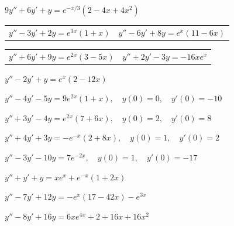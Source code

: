 \begin{exerciselist}
  \item\label{exer:5.4.14} $9y''+6y'+y=e^{-x/3}(2-4x+4x^{2})$


  \begin{tabular}[t]{@{}p{168pt}@{}p{168pt}}
    \item\label{exer:5.4.15} $y''-3y'+2y=e^{3x}(1+x)$ & \vspace*{10pt}
    \item\label{exer:5.4.16} $y''-6y'+8y=e^{x}(11-6x)$
  \end{tabular}

  \begin{tabular}[t]{@{}p{168pt}@{}p{168pt}}
    \item\label{exer:5.4.17} $y''+6y'+9y=e^{2x}(3-5x)$ &
    \item\label{exer:5.4.18} $y''+2y'-3y=-16xe^{x}$
  \end{tabular}

  \item\label{exer:5.4.19} $y''-2y'+y=e^{x}(2-12x)$

  \newpage

  \item\label{exer:5.4.20} \CGex $y''-4y'-5y=9e^{2x}(1+x),\quad y(0)=0,\quad y'(0)=-10$

  \item\label{exer:5.4.21} \CGex $y''+3y'-4y=e^{2x}(7+6x),\quad y(0)=2,\quad y'(0)=8$

  \item\label{exer:5.4.22} \CGex $y''+4y'+3y=-e^{-x}(2+8x),\quad y(0)=1,\quad y'(0)=2$

  \item\label{exer:5.4.23} \CGex $y''-3y'-10y=7e^{-2x},\quad y(0)=1,\quad y'(0)=-17$


  \item\label{exer:5.4.24} $y''+y'+y=xe^{x}+e^{-x}(1+2x)$

  \item\label{exer:5.4.25} $y''-7y'+12y=-e^{x}(17-42x)-e^{3x}$

  \item\label{exer:5.4.26} $y''-8y'+16y=6xe^{4x}+2+16x+16x^{2}$


\end{exerciselist}
